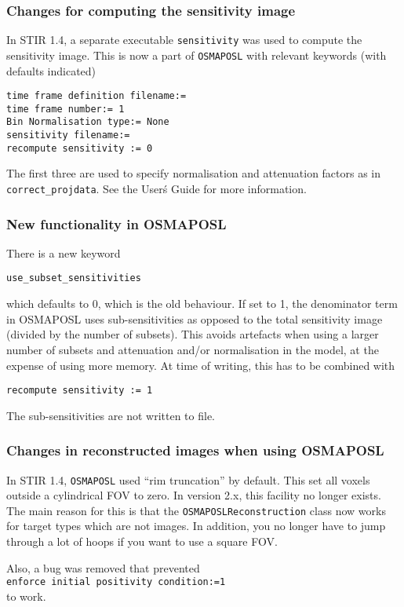 \documentclass{article}
\begin{document}
\subsubsection{Changes for computing the sensitivity image}
In STIR 1.4, a separate executable \texttt{sensitivity} was used to compute
the sensitivity image. This is now a part of \texttt{OSMAPOSL} with 
relevant keywords (with defaults indicated)
\begin{verbatim}
time frame definition filename:=
time frame number:= 1
Bin Normalisation type:= None
sensitivity filename:=
recompute sensitivity := 0
\end{verbatim}
The first three are used to specify normalisation and attenuation factors 
as in \texttt{correct\_projdata}. 
See the User\'s Guide for more information.

\subsubsection{New functionality in OSMAPOSL}
There is a new keyword
\begin{verbatim}
use_subset_sensitivities
\end{verbatim}
which defaults to 0, which is the old behaviour. If set to 1, the denominator
term in OSMAPOSL uses sub-sensitivities as opposed to the total sensitivity image
(divided by the number of subsets). This avoids artefacts when using a larger
number of subsets and attenuation and/or normalisation in the model, at the 
expense of using more memory.
At time of writing, this has to be combined with
\begin{verbatim}
recompute sensitivity := 1 
\end{verbatim} 
The sub-sensitivities are not written to file.

\subsubsection{Changes in reconstructed images when using OSMAPOSL}
\label{sec:changes_in_OSMAPOSL_images}

In STIR 1.4, \texttt{OSMAPOSL} used ``rim truncation'' by default. This 
set all voxels outside a cylindrical FOV to zero. In version 2.x, this facility
no longer exists. The main reason for this is that the
\texttt{OSMAPOSLReconstruction} class now works for target types which are 
not images. In addition, you no longer have to jump through a lot of hoops 
if you want to use a square FOV. 

Also, a bug was removed that prevented\\
\texttt{enforce initial positivity condition:=1}\\
to work.
\end{document}
